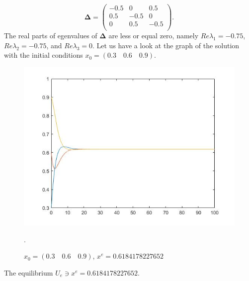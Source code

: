 \documentclass[a4paper,10pt, english]{article}
\begin{document}
$$
\mathbf{\Delta} = 
\left(
\begin{matrix}
-0.5   & 0 & 0.5 \\
0.5 &  -0.5 & 0 \\
0 &  0.5 & -0.5 \\
\end{matrix}
\right).
$$
The real parts of egenvalues of $\mathbf{\Delta}$ are less or equal zero, namely $Re\lambda_1 = -0.75$,  $Re\lambda_2 = -0.75$, and $Re\lambda_3 = 0$.
Let us have a look at the graph of the solution with the initial conditions $x_0 = (0.3\quad 0.6\quad 0.9)$.

\begin{figure}[ht]
\label{fig_c1}
\centering
\includegraphics[scale=0.4]{1.jpg}
\caption{$x_0 = (0.3 \quad0.6\quad 0.9)$, $x^e = 0.6184178227652$}.
\end{figure}

The equilibrium  $U_e\ni x^e = 0.6184178227652$.
\end{document}
